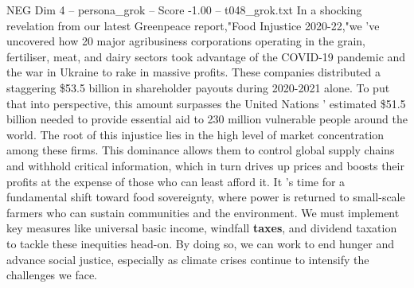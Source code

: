 \begin{textsample}{NEG Dim 4 – persona\_grok – Score -1.00 – t048\_grok.txt}  \label{ex:f4_neg_021}
In a shocking revelation from our latest Greenpeace report,"Food Injustice 2020-22,"we 've uncovered how 20 major agribusiness corporations operating in the grain, fertiliser, meat, and dairy sectors took advantage of the COVID-19 pandemic and the war in Ukraine to rake in massive profits.
These companies distributed a staggering \$53.5 billion in shareholder payouts during 2020-2021 alone.
To put that into perspective, this amount surpasses the United Nations ' estimated \$51.5 billion needed to provide essential aid to 230 million vulnerable people around the world.
The root of this injustice lies in the high level of market concentration among these firms.
This dominance allows them to control global supply chains and withhold critical information, which in turn drives up prices and boosts their profits at the expense of those who can least afford it.
It 's time for a fundamental shift toward food sovereignty, where power is returned to small-scale farmers who can sustain communities and the environment.
We must implement key measures like universal basic income, windfall \textbf{taxes}, and dividend taxation to tackle these inequities head-on.
By doing so, we can work to end hunger and advance social justice, especially as climate crises continue to intensify the challenges we face.

\end{textsample}
